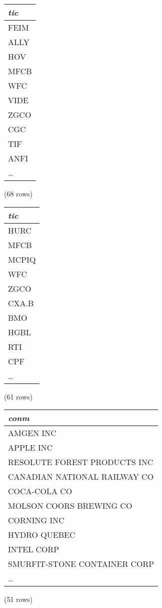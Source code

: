 \begin{center}
\begin{tabular}{l}
\textit{tic} \\
\hline
FEIM \\
ALLY \\
HOV \\
MFCB \\
WFC \\
VIDE \\
ZGCO \\
CGC \\
TIF \\
ANFI \\
\ldots \\
\end{tabular}

\noindent (68 rows) \\
\end{center}

\begin{center}
\begin{tabular}{l}
\textit{tic} \\
\hline
HURC \\
MFCB \\
MCPIQ \\
WFC \\
ZGCO \\
CXA.B \\
BMO \\
HGBL \\
RTI \\
CPF \\
\ldots \\
\end{tabular}

\noindent (61 rows) \\
\end{center}

\begin{center}
\begin{tabular}{l}
\textit{conm} \\
\hline
AMGEN INC \\
APPLE INC \\
RESOLUTE FOREST PRODUCTS INC \\
CANADIAN NATIONAL RAILWAY CO \\
COCA-COLA CO \\
MOLSON COORS BREWING CO \\
CORNING INC \\
HYDRO QUEBEC \\
INTEL CORP \\
SMURFIT-STONE CONTAINER CORP \\
\ldots \\
\end{tabular}

\noindent (51 rows) \\
\end{center}

